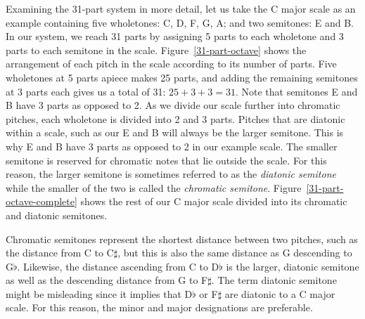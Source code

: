 Examining the 31-part system in more detail, let us take the C major scale as an example
containing five wholetones: C, D, F, G, A; and two semitones: E and B. In our system,
we reach 31 parts by assigning 5 parts to each wholetone and 3 parts to each semitone in
the scale.  Figure~\ref{31-part-octave} shows the arrangement of each pitch in the scale
according to its number of parts.  Five wholetones at
5 parts apiece makes 25 parts, and adding the remaining semitones at 3 parts each gives us
a total of 31: $ 25 + 3 + 3 = 31 $. Note that semitones E and B have 3 parts as opposed to
2.  As we divide our scale further into chromatic pitches, each wholetone is divided into
2 and 3 parts.  Pitches that are diatonic within a scale, such as our E and B will always
be the larger semitone.  This is why E and B have 3 parts as opposed to 2 in our example
scale.  The smaller semitone is reserved for chromatic notes that lie outside the scale.
For this reason, the larger semitone is sometimes referred to as the \textit{diatonic
semitone} while the smaller of the two is called the \textit{chromatic semitone}.
Figure~\ref{31-part-octave-complete} shows the rest of our C major scale divided into its
chromatic and diatonic semitones.

Chromatic semitones represent the shortest distance between two pitches, such as the
distance from C to C$\sharp$, but this is also the same distance as G descending to
G$\flat$.  Likewise, the distance ascending from C to D$\flat$ is the larger, diatonic
semitone as well as the descending distance from G to F$\sharp$. The term diatonic
semitone might be misleading since it implies that D$\flat$ or F$\sharp$ are diatonic to a
C major scale.  For this reason, the minor and major designations are preferable.

